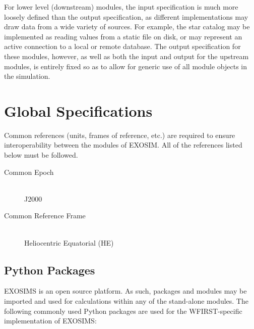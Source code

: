 \documentclass[cleanfoot]{asme2ej}
\begin{document}
For lower level (downstream) modules, the input specification is much more loosely defined than the output specification, as different implementations may draw data from a wide variety of sources.  For example, the star catalog may be implemented as reading values from a static file on disk, or may represent an active connection to a local or remote database.  The output specification for these modules, however, as well as both the input and output for the upstream modules, is entirely fixed so as to allow for generic use of all module objects in the simulation.


\section{Global Specifications}
Common references (units, frames of reference, etc.) are required to ensure interoperability between the modules of EXOSIM.  All of the references listed below must be followed.

\begin{description}
    \item[Common Epoch] \hfill \\ J2000
    \item[Common Reference Frame] \hfill \\ Heliocentric Equatorial (HE)
\end{description}

\subsection{Python Packages} 
EXOSIMS is an open source platform.  As such, packages and modules may be imported and used for calculations within any of the stand-alone modules.  The following commonly used Python packages are used for the WFIRST-specific implementation of EXOSIMS:
\end{document}

